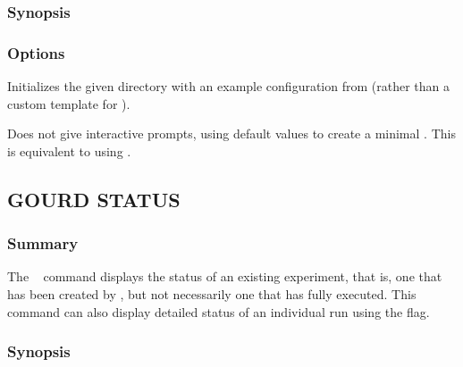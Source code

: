 \documentclass[a4paper,english]{article}
\begin{document}
\begin{adjustwidth}{18pt}{0pt}
            \subsubsection{Synopsis}
                 

            \subsubsection{Options}
                \begin{Description}[Options]
                \item[\OptArg{-e, --example}{ example-name}]
                Initializes the given directory with an example configuration from 
                (rather than a custom template for ).
                \item[\Opt{-q, --quick}]
                Does not give interactive prompts, using default values to create a minimal .
                This is equivalent to using .
                \end{Description}

        \subsection{GOURD STATUS}

            \subsubsection{Summary}
                The ~ command displays the status of an existing experiment,
                that is, one that has been created by  , but not necessarily
                one that has fully executed.
                This command can also display detailed status of an individual run using the  flag.

            \subsubsection{Synopsis}


\end{adjustwidth}
\end{document}
